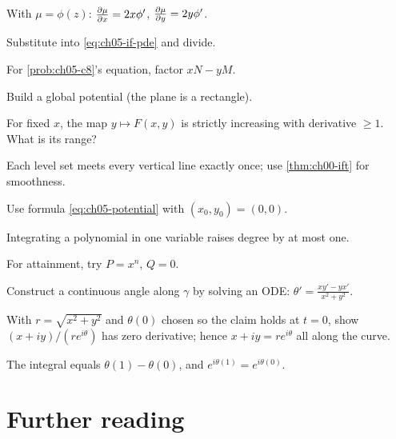 \begin{hintlevels}
  \item With $\mu = \phi(z)$: $\frac{\partial \mu}{\partial x} = 2x\phi'$, $\frac{\partial \mu}{\partial y} = 2y\phi'$.
  \item Substitute into \eqref{eq:ch05-if-pde} and divide.
  \item For \cref{prob:ch05-c8}'s equation, factor $xN - yM$.
\end{hintlevels}

\begin{hintlevels}
  \item Build a global potential (the plane is a rectangle).
  \item For fixed $x$, the map $y\mapsto F(x,y)$ is strictly increasing with
        derivative $\ge 1$. What is its range?
  \item Each level set meets every vertical line exactly once; use
        \cref{thm:ch00-ift} for smoothness.
\end{hintlevels}

\begin{hintlevels}
  \item Use formula \eqref{eq:ch05-potential} with $(x_0,y_0) = (0,0)$.
  \item Integrating a polynomial in one variable raises degree by at most one.
  \item For attainment, try $P = x^n$, $Q = 0$.
\end{hintlevels}

\begin{hintlevels}
  \item Construct a continuous angle along $\gamma$ by solving an ODE:
        $\theta' = \frac{xy' - yx'}{x^2+y^2}$.
  \item With $r = \sqrt{x^2+y^2}$ and $\theta(0)$ chosen so the claim holds at
        $t = 0$, show $(x + iy)/(re^{i\theta})$ has zero derivative; hence
        $x + iy = re^{i\theta}$ all along the curve.
  \item The integral equals $\theta(1) - \theta(0)$, and
        $e^{i\theta(1)} = e^{i\theta(0)}$.
\end{hintlevels}

\section{Further reading}\label{sec:ch05-reading}

